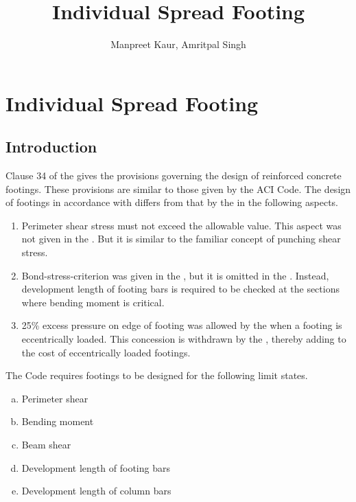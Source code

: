 \documentclass{report}
\title{Individual Spread Footing}
\author{Manpreet Kaur, Amritpal Singh}
\begin{document}
\maketitle
\tableofcontents
\listoffigures
\listofcharts
\listoftables
\setcounter{chapter}{11}
\chapter{Individual Spread Footing}
\section{Introduction} Clause 34 of the   gives the provisions
governing the design of reinforced concrete footings.  These provisions are
similar to those given by the ACI Code. The design of footings in
accordance with  differs from that by
the  in the following aspects.

\begin{enumerate}[I]
\item Perimeter shear stress must not exceed the allowable value. This
aspect was not given in the . But it is similar to the familiar
concept of punching shear stress.

\item Bond-stress-criterion was given in the , but it is omitted in
the . Instead, development length of footing bars is required to be
checked at the sections where bending moment is critical.

\item 25\% excess pressure on edge of footing was allowed by the 
when a footing is eccentrically loaded. This concession is withdrawn by
the , thereby adding to the cost of eccentrically loaded footings.
\end{enumerate}
The Code requires footings to be designed for the following limit states.

\begin{enumerate}[(a)]
\item Perimeter shear
\item Bending moment
\item Beam shear
\item Development length of footing bars
\item Development length of column bars
\end{enumerate}
\end{document}
